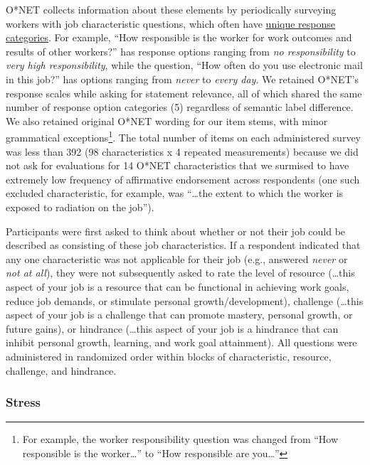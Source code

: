 \documentclass[
  man]{apa7}
\begin{document}
O*NET collects information about these elements by periodically surveying workers with job characteristic questions, which often have \href{https://www.ONETonline.org/find/descriptor/result/4.C.1.c.2}{unique response categories}. For example, ``How responsible is the worker for work outcomes and results of other workers?'' has response options ranging from \emph{no responsibility} to \emph{very high responsibility}, while the question, ``How often do you use electronic mail in this job?'' has options ranging from \emph{never} to \emph{every day}. We retained O*NET's response scales while asking for statement relevance, all of which shared the same number of response option categories (5) regardless of semantic label difference. We also retained original O*NET wording for our item stems, with minor grammatical exceptions\footnote{For example, the worker responsibility question was changed from ``How responsible is the worker\ldots{}'' to ``How responsible are you\ldots{}''}. The total number of items on each administered survey was less than 392 (98 characteristics x 4 repeated measurements) because we did not ask for evaluations for 14 O*NET characteristics that we surmised to have extremely low frequency of affirmative endorsement across respondents (one such excluded characteristic, for example, was ``\ldots the extent to which the worker is exposed to radiation on the job'').

Participants were first asked to think about whether or not their job could be described as consisting of these job characteristics. If a respondent indicated that any one characteristic was not applicable for their job (e.g., answered \emph{never} or \emph{not at all}), they were not subsequently asked to rate the level of resource (\ldots this aspect of your job is a resource that can be functional in achieving work goals, reduce job demands, or stimulate personal growth/development), challenge (\ldots this aspect of your job is a challenge that can promote mastery, personal growth, or future gains), or hindrance (\ldots this aspect of your job is a hindrance that can inhibit personal growth, learning, and work goal attainment). All questions were administered in randomized order within blocks of characteristic, resource, challenge, and hindrance.

\hypertarget{stress}{%
\subsubsection{Stress}\label{stress}}
\end{document}
